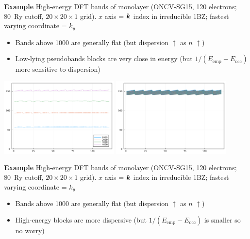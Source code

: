 \documentclass[t]{beamer}
\begin{document}
\begin{frame}[allowframebreaks]
\textbf{Example} High-energy DFT bands of  monolayer 
(ONCV-SG15, 120 electrons; \SI{80}{Ry} cutoff, $20 \times 20 \times 1$ grid). 
$x$ axis = $\vb*{k}$ index in irreducible 1BZ; 
fastest varying coordinate = $k_y$ 

\vspace{0.5cm}

\begin{itemize}
    \item[\faHandPointRight] Bands above 1000 are generally flat (but dispersion $\uparrow$ as $n$ $\uparrow$)
    \item[\faHandPointRight] Low-lying pseudobands blocks are very close in energy 
    (but $1 / (E_{\text{emp}} - E_{\text{occ}})$ more sensitive to dispersion)
\end{itemize}

\framebreak

\begin{center}
    \includegraphics[width=0.45\textwidth]{../data/energy/energies-different-blocks.png}
    \includegraphics[width=0.45\textwidth]{../data/energy/energies-same-blocks-4000.png}
\end{center}

\textbf{Example} High-energy DFT bands of  monolayer 
(ONCV-SG15, 120 electrons; \SI{80}{Ry} cutoff, $20 \times 20 \times 1$ grid). 
$x$ axis = $\vb*{k}$ index in irreducible 1BZ; 
fastest varying coordinate = $k_y$ 

\vspace{0.5cm}

\begin{itemize}
    \item[\faHandPointRight] Bands above 1000 are generally flat (but dispersion $\uparrow$ as $n$ $\uparrow$)
    \item[\faHandPointRight] High-energy blocks are more dispersive 
    (but $1 / (E_{\text{emp}} - E_{\text{occ}})$ is smaller so no worry)
\end{itemize}

\end{frame}
\end{document}
